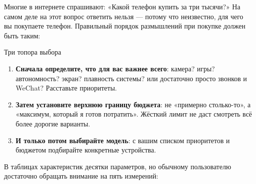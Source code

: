 


Многие в интернете спрашивают: «Какой телефон купить за три тысячи?» На самом деле на этот вопрос ответить нельзя — потому что неизвестно, для чего вы покупаете телефон. Правильный порядок размышлений при покупке должен быть таким:

\begin{tcbinfo}{Три топора выбора}
\begin{enumerate}
  \item \textbf{Сначала определите, что для вас важнее всего}: камера? игры? автономность? экран? плавность системы? или достаточно просто звонков и WeChat? Расставьте приоритеты.
  \item \textbf{Затем установите верхнюю границу бюджета}: не «примерно столько-то», а «максимум, который я готов потратить». Жёсткий лимит не даст смотреть всё более дорогие варианты.
  \item \textbf{И только потом выбирайте модель}: с вашим списком приоритетов и бюджетом подбирайте конкретные устройства.
\end{enumerate}

\end{tcbinfo}


В таблицах характеристик десятки параметров, но обычному пользователю достаточно обращать внимание на пять измерений:

